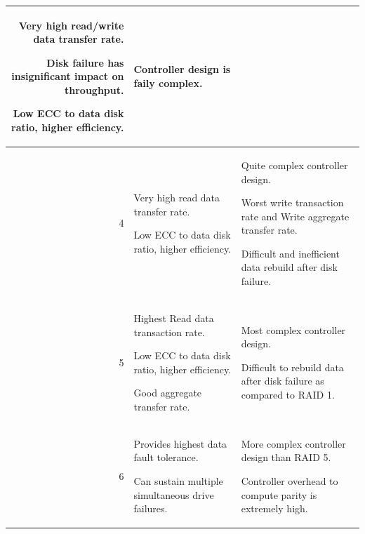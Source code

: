 \begin{table}[H]
\begin{tabularx}{\textwidth}{|r|*{2}{>{\RaggedRight\arraybackslash}X|}}
        Very high read/write data transfer rate. \par
        Disk failure has insignificant impact on throughput. \par
        Low ECC to data disk ratio, higher efficiency.

        &

        Controller design is faily complex.
        
        \\ \hline

        4 &

        Very high read data transfer rate. \par
        Low ECC to data disk ratio, higher efficiency.

        &

        Quite complex controller design. \par
        Worst write transaction rate and Write aggregate transfer rate. \par
        Difficult and inefficient data rebuild after disk failure.

        \\ \hline

        5 &

        Highest Read data transaction rate. \par
        Low ECC to data disk ratio, higher efficiency. \par
        Good aggregate transfer rate.

        &

        Most complex controller design. \par
        Difficult to rebuild data after disk failure as compared to RAID 1.

        \\ \hline

        6 &

        Provides highest data fault tolerance. \par
        Can sustain multiple simultaneous drive failures.

        &

        More complex controller design than RAID 5. \par
        Controller overhead to compute parity is extremely high.

        \\ \hline
        
    \end{tabularx}
\end{table}

